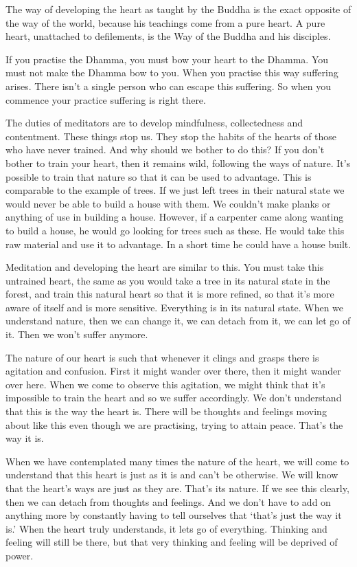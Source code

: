 The way of developing the heart as taught by the Buddha is the exact opposite of the way of the world, because his teachings come from a pure heart. A pure heart, unattached to defilements, is the Way of the Buddha and his disciples.

If you practise the Dhamma, you must bow your heart to the Dhamma. You must not make the Dhamma bow to you. When you practise this way suffering arises. There isn't a single person who can escape this suffering. So when you commence your practice suffering is right there.

The duties of meditators are to develop mindfulness, collectedness and contentment. These things stop us. They stop the habits of the hearts of those who have never trained. And why should we bother to do this? If you don't bother to train your heart, then it remains wild, following the ways of nature. It's possible to train that nature so that it can be used to advantage. This is comparable to the example of trees. If we just left trees in their natural state we would never be able to build a house with them. We couldn't make planks or anything of use in building a house. However, if a carpenter came along wanting to build a house, he would go looking for trees such as these. He would take this raw material and use it to advantage. In a short time he could have a house built.

Meditation and developing the heart are similar to this. You must take this untrained heart, the same as you would take a tree in its natural state in the forest, and train this natural heart so that it is more refined, so that it's more aware of itself and is more sensitive. Everything is in its natural state. When we understand nature, then we can change it, we can detach from it, we can let go of it. Then we won't suffer anymore.

The nature of our heart is such that whenever it clings and grasps there is agitation and confusion. First it might wander over there, then it might wander over here. When we come to observe this agitation, we might think that it's impossible to train the heart and so we suffer accordingly. We don't understand that this is the way the heart is. There will be thoughts and feelings moving about like this even though we are practising, trying to attain peace. That's the way it is.

When we have contemplated many times the nature of the heart, we will come to understand that this heart is just as it is and can't be otherwise. We will know that the heart's ways are just as they are. That's its nature. If we see this clearly, then we can detach from thoughts and feelings. And we don't have to add on anything more by constantly having to tell ourselves that `that's just the way it is.' When the heart truly understands, it lets go of everything. Thinking and feeling will still be there, but that very thinking and feeling will be deprived of power.

